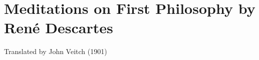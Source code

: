 \chapter{Meditations on First Philosophy by Ren\'e Descartes}\autocite{Descartes1}

Translated by John Veitch (1901)




